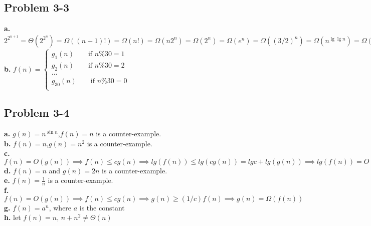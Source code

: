 \documentclass[12pt]{article}
\theoremstyle{definition}
\theoremstyle{remark}
\begin{document}
\subsection*{Problem 3-3}
\textbf{a.} $2^{2^{n+1}}=\Theta(2^{2^n})=\Omega((n+1)!)=\Omega(n!)=\Omega(n2^n)=\Omega(2^n)=\Omega(e^n)=\Omega((3/2)^n)=\Omega(n^{\lg\lg n})=\Omega((\lg n)!)=\Omega(n^3)=\Omega(4^{\lg n})=\Theta(n^2)=\Omega(n\lg n)=\Theta(\lg n!)=\Omega(n)=\Theta(2^{\lg n})=\Omega(\sqrt{2}^{\lg n}=\Omega(2^{\sqrt{2\lg n}})=\Omega(\lg^2n)=\Omega(\ln n)=\Omega(\sqrt{\lg n})=\Omega(\ln\ln n)=\Omega(2^{\lg^*n})=\Omega(\lg^*n)=\Omega(\lg^*\lg n)=\Omega(\lg\lg^*n)=\Omega(n^{1/\lg n})=\Theta(1)$\\
\textbf{b.}
\(
f(n)=\left\{
\begin{array}{rr}
g_1(n)\qquad \mbox{if $n\%30=1$}\\
g_2(n)\qquad \mbox{if $n\%30=2$}\\
...\\
g_{30}(n)\qquad \mbox{if $n\%30=0$}\\
\end{array}\right.
\)
\subsection*{Problem 3-4}
\textbf{a.} $g(n)=n^{\sin n}$,$f(n)=n$ is a counter-example.\\
\textbf{b.} $f(n)=n$,$g(n)=n^2$ is a counter-example.\\
\textbf{c.} $f(n)=O(g(n))\implies f(n)\le cg(n)\implies lg(f(n))\le lg(cg(n))=lgc + lg(g(n))\implies lg(f(n))=O(lg(g(n)))$\\
\textbf{d.} $f(n)=n$ and $g(n)=2n$ is a counter-example.\\
\textbf{e.} $f(n)=\frac{1}{n}$ is a counter-example.\\
\textbf{f.} $f(n)=O(g(n))\implies f(n)\le cg(n)\implies g(n)\ge (1/c)f(n)\implies g(n)=\Omega(f(n))$\\
\textbf{g.} $f(n)=a^n$, where $a$ is the constant\\
\textbf{h.} let $f(n)=n$, $n+n^2\ne \Theta(n)$
\end{document}
